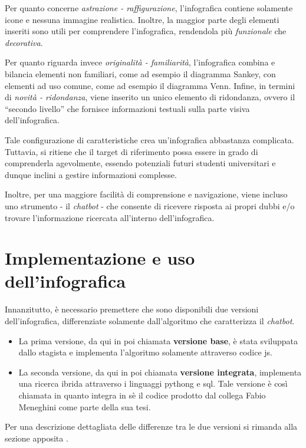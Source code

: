 Per quanto concerne \emph{astrazione - raffigurazione}, l'infografica contiene solamente icone e nessuna immagine realistica. Inoltre, la maggior parte degli elementi
inseriti sono utili per comprendere l'infografica, rendendola più \emph{funzionale} che \emph{decorativa}.

Per quanto riguarda invece \emph{originalità - familiarità}, l'infografica combina e bilancia elementi non familiari, come ad esempio il diagramma Sankey, con elementi
ad uso comune, come ad esempio il diagramma Venn. 
Infine, in termini di \emph{novità - ridondanza}, viene inserito un unico elemento di ridondanza, ovvero il ``secondo livello'' che fornisce informazioni testuali sulla parte visiva 
dell'infografica.

\bigskip
\noindent Tale configurazione di caratteristiche crea un'infografica abbastanza complicata. Tuttavia, si ritiene che il target di riferimento possa essere in grado di comprenderla agevolmente, essendo 
potenziali futuri studenti universitari e dunque inclini a gestire informazioni complesse. 

Inoltre, per una maggiore facilità di comprensione e navigazione, viene incluso uno strumento - il \emph{chatbot} - che consente di ricevere risposta ai propri dubbi e/o 
trovare l'informazione ricercata all'interno dell'infografica.

\section{Implementazione e uso dell'infografica}
Innanzitutto, è necessario premettere che sono disponibili due versioni dell'infografica, differenziate solamente dall'algoritmo che caratterizza il \emph{chatbot}.
\begin{itemize}
    \item La prima versione, da qui in poi chiamata \textbf{versione base}, è stata sviluppata dallo stagista e implementa l'algoritmo solamente attraverso codice \gls{js}. 
    \item La seconda versione, da qui in poi chiamata \textbf{versione integrata}, implementa una ricerca ibrida attraverso i linguaggi \gls{pythong} e \gls{sql}.
    Tale versione è così chiamata in quanto integra in sè il codice prodotto dal collega Fabio Meneghini come parte della sua tesi.    
\end{itemize}
Per una descrizione dettagliata delle differenze tra le due versioni si rimanda alla sezione apposita .

